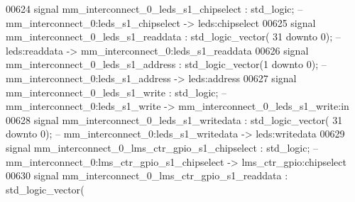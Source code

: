 \begin{DoxyCode}
00624     \textcolor{keywordflow}{signal} \textcolor{vhdlchar}{mm_interconnect_0_leds_s1_chipselect}                                        \textcolor{vhdlchar}{:} \textcolor{comment}{std\_logic};\textcolor{keyword}{        
                   -- mm\_interconnect\_0:leds\_s1\_chipselect -> leds:chipselect}
00625     \textcolor{keywordflow}{signal} \textcolor{vhdlchar}{mm_interconnect_0_leds_s1_readdata}                                          \textcolor{vhdlchar}{:} \textcolor{comment}{std\_logic\_vector}\textcolor{vhdlchar}{(}\textcolor{vhdllogic}{}\textcolor{vhdllogic}{
      31} \textcolor{keywordflow}{downto} \textcolor{vhdllogic}{}\textcolor{vhdllogic}{0}\textcolor{vhdlchar}{)};\textcolor{keyword}{ -- leds:readdata -> mm\_interconnect\_0:leds\_s1\_readdata}
00626     \textcolor{keywordflow}{signal} \textcolor{vhdlchar}{mm_interconnect_0_leds_s1_address}                                           \textcolor{vhdlchar}{:} \textcolor{comment}{std\_logic\_vector}\textcolor{vhdlchar}{(}\textcolor{vhdllogic}{}\textcolor{vhdllogic}{1}
       \textcolor{keywordflow}{downto} \textcolor{vhdllogic}{}\textcolor{vhdllogic}{0}\textcolor{vhdlchar}{)};\textcolor{keyword}{  -- mm\_interconnect\_0:leds\_s1\_address -> leds:address}
00627     \textcolor{keywordflow}{signal} \textcolor{vhdlchar}{mm_interconnect_0_leds_s1_write}                                             \textcolor{vhdlchar}{:} \textcolor{comment}{std\_logic};\textcolor{keyword}{        
                   -- mm\_interconnect\_0:leds\_s1\_write -> mm\_interconnect\_0\_leds\_s1\_write:in}
00628     \textcolor{keywordflow}{signal} \textcolor{vhdlchar}{mm_interconnect_0_leds_s1_writedata}                                         \textcolor{vhdlchar}{:} \textcolor{comment}{std\_logic\_vector}\textcolor{vhdlchar}{(}\textcolor{vhdllogic}{}\textcolor{vhdllogic}{
      31} \textcolor{keywordflow}{downto} \textcolor{vhdllogic}{}\textcolor{vhdllogic}{0}\textcolor{vhdlchar}{)};\textcolor{keyword}{ -- mm\_interconnect\_0:leds\_s1\_writedata -> leds:writedata}
00629     \textcolor{keywordflow}{signal} \textcolor{vhdlchar}{mm_interconnect_0_lms_ctr_gpio_s1_chipselect}                                \textcolor{vhdlchar}{:} \textcolor{comment}{std\_logic};\textcolor{keyword}{        
                   -- mm\_interconnect\_0:lms\_ctr\_gpio\_s1\_chipselect -> lms\_ctr\_gpio:chipselect}
00630     \textcolor{keywordflow}{signal} \textcolor{vhdlchar}{mm_interconnect_0_lms_ctr_gpio_s1_readdata}                                  \textcolor{vhdlchar}{:} \textcolor{comment}{std\_logic\_vector}\textcolor{vhdlchar}{(}\textcolor{vhdllogic}{}\textcolor{vhdllogic}{
}
\end{DoxyCode}
